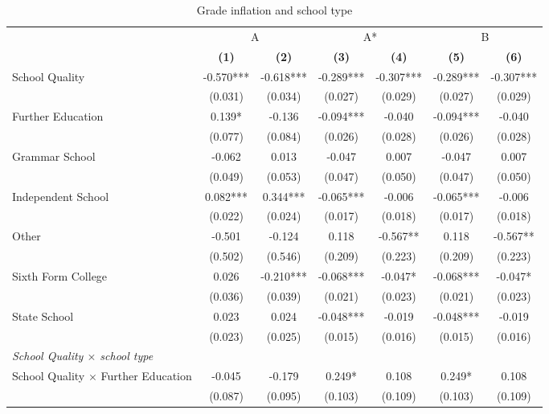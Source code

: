 \begin{table}[htbp]\centering
\begin{threeparttable}
\caption{Grade inflation and school type}
\label{tab:main_schooltype}
\footnotesize
\begin{tabular}{lcccccc}
\toprule
 & \multicolumn{2}{c}{A} & \multicolumn{2}{c}{A*} & \multicolumn{2}{c}{B} \\
\cmidrule(lr){2-3}\cmidrule(lr){4-5}\cmidrule(lr){6-7}
 & \textbf{(1)} & \textbf{(2)} & \textbf{(3)} & \textbf{(4)} & \textbf{(5)} & \textbf{(6)} \\
\midrule
School Quality & -0.570*** & -0.618*** & -0.289*** & -0.307*** & -0.289*** & -0.307*** \\
 & (0.031) & (0.034) & (0.027) & (0.029) & (0.027) & (0.029) \\

\midrule
Further Education & 0.139* & -0.136 & -0.094*** & -0.040 & -0.094*** & -0.040 \\
 & (0.077) & (0.084) & (0.026) & (0.028) & (0.026) & (0.028) \\

Grammar School & -0.062 & 0.013 & -0.047 & 0.007 & -0.047 & 0.007 \\
 & (0.049) & (0.053) & (0.047) & (0.050) & (0.047) & (0.050) \\

Independent School  & 0.082*** & 0.344*** & -0.065*** & -0.006 & -0.065*** & -0.006 \\
 & (0.022) & (0.024) & (0.017) & (0.018) & (0.017) & (0.018) \\

Other & -0.501 & -0.124 & 0.118 & -0.567** & 0.118 & -0.567** \\
 & (0.502) & (0.546) & (0.209) & (0.223) & (0.209) & (0.223) \\

Sixth Form College& 0.026 & -0.210*** & -0.068*** & -0.047* & -0.068*** & -0.047* \\
 & (0.036) & (0.039) & (0.021) & (0.023) & (0.021) & (0.023) \\

State School & 0.023 & 0.024 & -0.048*** & -0.019 & -0.048*** & -0.019 \\
 & (0.023) & (0.025) & (0.015) & (0.016) & (0.015) & (0.016) \\

\midrule
\multicolumn{7}{l}{\textit{School Quality $\times$ school type} }\\
School Quality $\times$ Further Education & -0.045 & -0.179 & 0.249* & 0.108 & 0.249* & 0.108 \\
 & (0.087) & (0.095) & (0.103) & (0.109) & (0.103) & (0.109) \\


\end{tabular}
\end{threeparttable}
\end{table}
